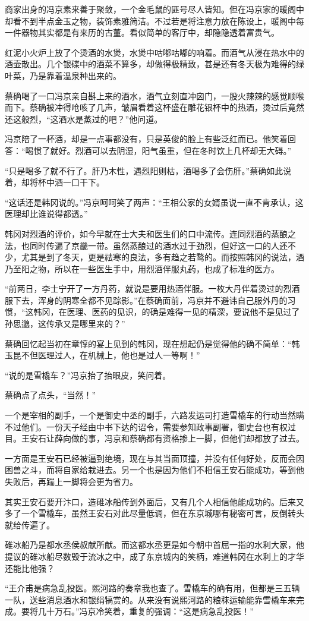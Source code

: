 商家出身的冯京素来善于聚敛，一个金毛鼠的匪号尽人皆知。但在冯京家的暖阁中却看不到半点金玉之物，装饰素雅简洁。不过若是将注意力放在陈设上，暖阁中每一件器物其实都是有来历的古董。看似简单的客厅中，却隐隐透着富贵气。

红泥小火炉上放了个烫酒的水煲，水煲中咕嘟咕嘟的响着。而酒气从浸在热水中的酒壶散出。几个银碟中的酒菜不算多，却做得极精致，甚是还有冬天极为难得的绿叶菜，乃是靠着温泉种出来的。

蔡确喝了一口冯京亲自斟上来的酒水，酒气立刻直冲囟门，一股火辣辣的感觉顺喉而下。蔡确被冲得呛咳了几声，皱眉看着这杯盛在雕花银杯中的热酒，烫过后竟然还这般烈，“这酒水是蒸过的吧？”他问道。

冯京陪了一杯酒，却是一点事都没有，只是英俊的脸上有些泛红而已。他笑着回答：“喝惯了就好。烈酒可以去阴湿，阳气虽重，但在冬时饮上几杯却无大碍。”

“只是喝多了就不行了。肝乃木性，遇烈阳则枯，酒喝多了会伤肝。”蔡确如此说着，却将杯中酒一口干下。

“这话还是韩冈说的。”冯京呵呵笑了两声：“王相公家的女婿虽说一直不肯承认，这医理却比谁说得都透。”

韩冈对烈酒的评价，如今早就在士大夫和医生们的口中流传。连同烈酒的蒸酿之法，也同时传遍了京畿一带。虽然蒸酿过的酒水过于劲烈，但好这一口的人还不少，尤其是到了冬天，更是祛寒的良法，多有趋之若鹜的。而按照韩冈的说法，酒乃至阳之物，所以在一些医生手中，用烈酒伴服丸药，也成了标准的医方。

“前两日，李士宁开了一方丹药，就说是要用热酒伴服。一枚大丹伴着烫过的烈酒服下去，浑身的阴寒全都不见踪影。”在蔡确面前，冯京并不避讳自己服外丹的习惯，“这韩冈，在医理、医药的见识，的确是难得一见的精深，要说他不是见过了孙思邈，这传承又是哪里来的？”

蔡确回忆起当初在章惇的宴上见到的韩冈，现在想起仍是觉得他的确不简单：“韩玉昆不但医理过人，在机械上，他也是过人一等啊！”

“说的是雪橇车？”冯京抬了抬眼皮，笑问着。

蔡确点了点头，“当然！”

一个是宰相的副手，一个是御史中丞的副手，六路发运司打造雪橇车的行动当然瞒不过他们。一份天子经由中书下达的诏令，需要参知政事副署，御史台也有权过目。王安石让薛向做的事，冯京和蔡确都有资格掺上一脚，但他们却都放了过去。

一方面是王安石已经被逼到绝境，现在与其当面顶撞，并没有任何好处，反而会因困兽之斗，而将自家给栽进去。另一个也是因为他们不相信王安石能成功，等到他失败后，再踹上一脚将会更为省力。

其实王安石要开汴口，造碓冰船传到外面后，又有几个人相信他能成功的。后来又多了一个雪橇车，虽然王安石对此尽量低调，但在东京城哪有秘密可言，反倒转头就给传遍了。

碓冰船乃是都水丞侯叔献所献。而这都水丞更是如今朝中首屈一指的水利大家，他提议的碓冰船尽数毁于流冰之中，成了东京城内的笑柄，难道韩冈在水利上的才华还能比他强？

“王介甫是病急乱投医。熙河路的奏章我也查了。雪橇车的确有用，但都是三五辆一队，送些消息酒水和银绢犒赏的。从来没有说熙河路的粮秣运输能靠雪橇车来完成。要将几十万石。”冯京冷笑着，重复的强调：“这是病急乱投医！”

